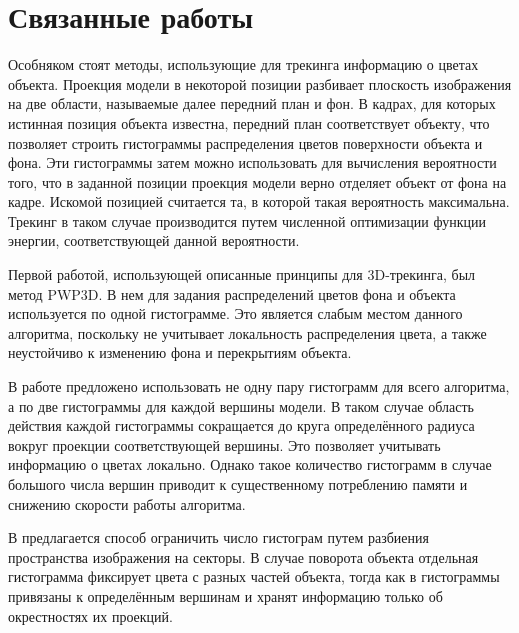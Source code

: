 \section{Связанные работы}


Особняком стоят методы, использующие для трекинга информацию о цветах объекта.
Проекция модели в некоторой позиции разбивает плоскость изображения на две
области, называемые далее передний план и фон.
В кадрах, для которых истинная позиция объекта известна, передний план
соответствует объекту, что позволяет строить гистограммы распределения цветов
поверхности объекта и фона.
Эти гистограммы затем можно использовать для вычисления вероятности того, что в
заданной позиции проекция модели верно отделяет объект от фона на кадре.
Искомой позицией считается та, в которой такая вероятность максимальна.
Трекинг в таком случае производится путем численной оптимизации функции
энергии, соответствующей данной вероятности.

Первой работой, использующей описанные принципы для 3D-трекинга,
был метод PWP3D\cite{PWP3D}.
В нем для задания распределений цветов фона и объекта используется по одной
гистограмме.
Это является слабым местом данного алгоритма, поскольку не учитывает
локальность распределения цвета, а также неустойчиво к изменению фона
и перекрытиям объекта.

В работе \cite{Tjaden2017} предложено использовать не одну пару гистограмм для
всего алгоритма, а по две гистограммы для каждой вершины модели.
В таком случае область действия каждой гистограммы сокращается до круга
определённого радиуса вокруг проекции соответствующей вершины.
Это позволяет учитывать информацию о цветах локально.
Однако такое количество гистограмм в случае большого числа вершин приводит к
существенному потреблению памяти и снижению скорости работы алгоритма.

В \cite{RegionPhotometric} предлагается способ ограничить число гистограм
путем разбиения пространства изображения на секторы.
В случае поворота объекта отдельная гистограмма фиксирует цвета с разных частей
объекта, тогда как в \cite{Tjaden2017} гистограммы привязаны к определённым
вершинам и хранят информацию только об окрестностях их проекций.

